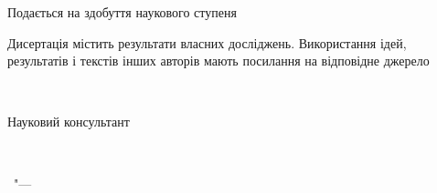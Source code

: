\vspace{0pt plus2fill} %
\noindent
Подається на здобуття наукового ступеня
\emph{\thesisDegree}

\vspace{0pt plus4fill} %
\noindent
Дисертація містить результати власних досліджень. Використання ідей, результатів і текстів інших авторів мають посилання на відповідне джерело

\noindent \underline{\hspace{3cm}}\,\thesisAuthorShort

%
\vspace{0pt plus4fill} %
\noindent
Науковий консультант
\parbox[t]{0.6\linewidth}{\raggedright
\supervisorFio\\
\supervisorRegalia
}
%
\vspace{0pt plus4fill} %
\begin{center}%
{\thesisCity\ "--- \thesisYear}
\end{center}%
\newpage
